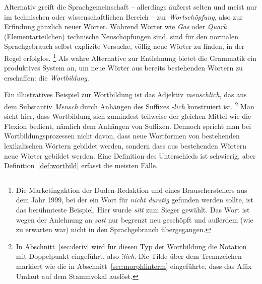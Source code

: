 \begin{exe}
  \ex \label{ex:morph5510}
  \begin{xlist}
  \end{xlist}
\end{exe}

Alternativ greift die Sprachgemeinschaft -- allerdings äußerst selten und meist nur im technischen oder wissenschaftlichen Bereich -- zur \textit{Wortschöpfung}, also zur Erfindung gänzlich neuer Wörter.
Während Wörter wie \textit{Gas} oder \textit{Quark} (Elementarteilchen) technische Neuschöpfungen sind, sind für den normalen Sprachgebrauch selbst explizite Versuche, völlig neue Wörter zu finden, in der Regel erfolglos.%
\footnote{Die Marketingaktion der Duden-Redaktion und eines Brauseherstellers aus dem Jahr 1999, bei der ein Wort für \textit{nicht durstig} gefunden werden sollte, ist das berühmteste Beispiel.
Hier wurde \textit{sitt} zum Sieger gewählt.
Das Wort ist wegen der Anlehnung an \textit{satt} nur begrenzt neu geschöpft und außerdem (wie zu erwarten war) nicht in den Sprachgebrauch übergegangen.}
Als wahre Alternative zur Entlehnung bietet die Grammatik ein produktives System an, um neue Wörter aus bereits bestehenden Wörtern zu erschaffen: die \textit{Wortbildung}.

Ein illustratives Beispiel zur Wortbildung ist \zB das Adjektiv \textit{menschlich}, das aus dem Substantiv \textit{Mensch} durch Anhängen des Suffixes \textit{-lich} konstruiert ist.%
\footnote{In Abschnitt~\ref{sec:deriv} wird für diesen Typ der Wortbildung die Notation mit Doppelpunkt eingeführt, also \textit{\~:lich}.
Die Tilde über dem Trennzeichen markiert wie die in Abschnitt~\ref{sec:morphlinterm} eingeführte, dass das Affix Umlaut auf dem Stammvokal auslöst.}
Man sieht hier, dass Wortbildung sich zumindest teilweise der gleichen Mittel wie die Flexion bedient, nämlich \zB dem Anhängen von Suffixen.
Dennoch spricht man bei Wortbildungsprozessen nicht davon, dass neue Wortformen von bestehenden lexikalischen Wörtern gebildet werden, sondern dass aus bestehenden Wörtern neue Wörter gebildet werden.
Eine Definition des Unterschieds ist schwierig, aber Definition~\ref{def:wortbild} erfasst die meisten Fälle.

